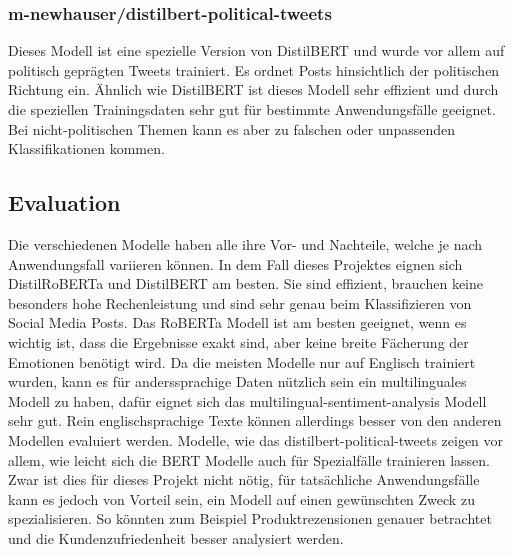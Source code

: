 \subsubsection{m-newhauser/distilbert-political-tweets}
Dieses Modell ist eine spezielle Version von DistilBERT und wurde vor allem auf politisch geprägten Tweets trainiert. Es ordnet Posts hinsichtlich der politischen Richtung ein. Ähnlich wie DistilBERT ist dieses Modell sehr effizient und durch die speziellen Trainingsdaten sehr gut für bestimmte Anwendungsfälle geeignet. Bei nicht-politischen Themen kann es aber zu falschen oder unpassenden Klassifikationen kommen.

\subsection{Evaluation}
Die verschiedenen Modelle haben alle ihre Vor- und Nachteile, welche je nach Anwendungsfall variieren können. In dem Fall dieses Projektes eignen sich DistilRoBERTa und DistilBERT am besten. Sie sind effizient, brauchen keine besonders hohe Rechenleistung und sind sehr genau beim Klassifizieren von Social Media Posts. Das RoBERTa Modell ist am besten geeignet, wenn es wichtig ist, dass die Ergebnisse exakt sind, aber keine breite Fächerung der Emotionen benötigt wird. Da die meisten Modelle nur auf Englisch trainiert wurden, kann es für anderssprachige Daten nützlich sein ein multilinguales Modell zu haben, dafür eignet sich das multilingual-sentiment-analysis Modell sehr gut. Rein englischsprachige Texte können allerdings besser von den anderen Modellen evaluiert werden. Modelle, wie das distilbert-political-tweets zeigen vor allem, wie leicht sich die BERT Modelle auch für Spezialfälle trainieren lassen. Zwar ist dies für dieses Projekt nicht nötig, für tatsächliche Anwendungsfälle kann es jedoch von Vorteil sein, ein Modell auf einen gewünschten Zweck zu spezialisieren. So könnten zum Beispiel Produktrezensionen genauer betrachtet und die Kundenzufriedenheit besser analysiert werden.